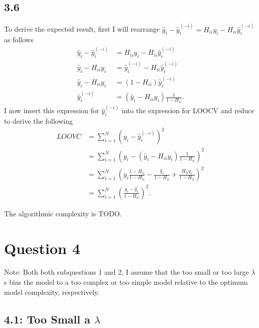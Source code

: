 \documentclass[12pt]{amsart}
\begin{document}
\subsection*{3.6}

To derive the expected result, first I will rearrange $\hat{y}_i - \hat{y}_i^{(-i)} = H_{ii}y_i - H_{ii}\hat{y}_i^{(-i)}$ as follows
\begin{equation}
\begin{split}
\hat{y}_i - \hat{y}_i^{(-i)} & = H_{ii}y_i - H_{ii}\hat{y}_i^{(-i)}  \\
\hat{y}_i - H_{ii}y_i & =  \hat{y}_i^{(-i)} - H_{ii}\hat{y}_i^{(-i)} \\
\hat{y}_i - H_{ii}y_i & =  (1 - H_{ii})\hat{y}_i^{(-i)} \\
\hat{y}_i^{(-i)} & = (\hat{y}_i - H_{ii}y_i) \frac{1}{1 - H_{ii}}.
\end{split}
\end{equation} 
I now insert this expression for $\hat{y}_i^{(-i)}$ into the expression for LOOCV and reduce to derive the following
\begin{equation}
\begin{split}
LOOVC & = \sum_{i = 1}^N (y_i - \hat{y}_i^{(-i)})^2 \\
& = \sum_{i = 1}^N \left( y_i -  (\hat{y}_i - H_{ii}y_i) \frac{1}{1 - H_{ii}} \right)^2 \\
& = \sum_{i = 1}^N \left( y_i\frac{1 - H_{ii}}{1 - H_{ii}} -  \frac{\hat{y}_i}{1 - H_{ii}}  + \frac{H_{ii}y_i}{1 - H_{ii}}  \right)^2 \\
& = \sum_{i = 1}^N \left( \frac{y_i - \hat{y_i}}{1 - H_{ii}} \right)^2.
\end{split}
\end{equation}

The algorithmic complexity is TODO.


\section*{Question 4}

Note: Both both subquestions 1 and 2, I assume that the too small or too large $\lambda$s bias the model to a too complex or too simple model relative to the optimum model complexity, respectively.

\subsection*{4.1: Too Small a $\lambda$}
\end{document}
